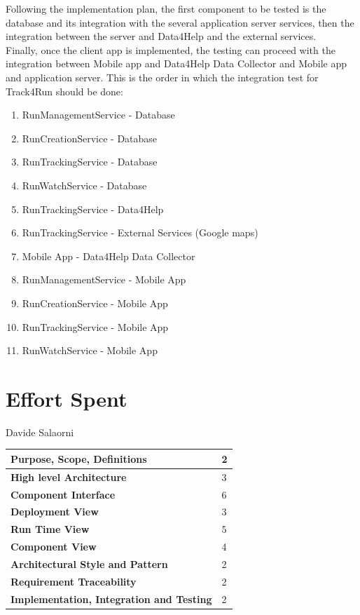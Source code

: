 \documentclass[a4paper]{article}
\begin{document}
\noindent Following the implementation plan, the first component to be tested is the database and its integration with the several application server services, then the integration between the server and Data4Help and the external services.\\
Finally, once the client app is implemented, the testing can proceed with the integration between Mobile app and Data4Help Data Collector and Mobile app and application server.
\newline\newline This is the order in which the integration test for Track4Run should be done:

\begin{enumerate}[label*=\bf{\arabic*} . ]
    \item RunManagementService - Database
    \item RunCreationService - Database
    \item RunTrackingService - Database
    \item RunWatchService - Database
    \item RunTrackingService - Data4Help
    \item RunTrackingService - External Services (Google maps)
    \item Mobile App - Data4Help Data Collector
    \item RunManagementService - Mobile App
    \item RunCreationService - Mobile App
    \item RunTrackingService - Mobile App
    \item RunWatchService - Mobile App
\end{enumerate}

\clearpage

\section{Effort Spent}

Davide Salaorni

\begin{center}
\begin{tabular}{|l | l |}
    \hline \bf{Purpose, Scope, Definitions} & 2 \\ \hline
    \bf{High level Architecture}  & 3 \\ \hline
    \bf{Component Interface} & 6 \\ \hline
    \bf{Deployment View} & 3 \\ \hline
    \bf{Run Time View} & 5\\ \hline
    \bf{Component View} & 4 \\ \hline
    \bf{Architectural Style and Pattern} & 2 \\ \hline
    \bf{Requirement Traceability} & 2 \\ \hline
    \bf{Implementation, Integration and Testing} & 2 \\ \hline
\end{tabular}
\end{center}
\end{document}
